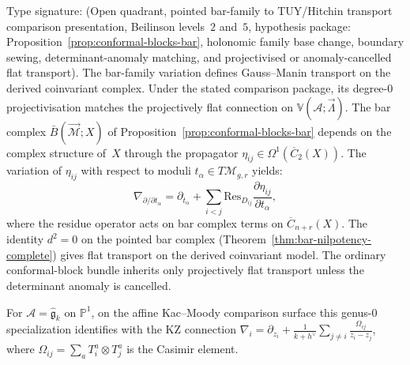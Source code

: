 \begin{proposition}
\label{prop:kzb-bar-complex}
Type signature: \textup{(}Open quadrant, pointed bar-family to
TUY/Hitchin transport comparison presentation, Beilinson levels~$2$
and~$5$, hypothesis package: Proposition~\textup{\ref{prop:conformal-blocks-bar}},
holonomic family base change, boundary sewing, determinant-anomaly
matching, and projectivised or anomaly-cancelled flat
transport\textup{)}.
The bar-family variation defines Gauss--Manin transport on the derived
coinvariant complex. Under the stated comparison package, its
degree-$0$ projectivisation matches the projectively flat connection on
$\mathbb{V}(\mathcal{A}; \vec{\Lambda})$. The bar complex
$\bar{B}(\vec{\mathcal{M}}; X)$ of
Proposition~\textup{\ref{prop:conformal-blocks-bar}} depends on the
complex structure of~$X$ through the propagator
$\eta_{ij} \in \Omega^1(\overline{C}_2(X))$. The variation
of $\eta_{ij}$ with respect to moduli $t_\alpha \in T\mathcal{M}_{g,r}$
yields:
\[
\nabla_{\partial/\partial t_\alpha}
= \partial_{t_\alpha}
+ \sum_{i<j}
\mathrm{Res}_{D_{ij}} \frac{\partial \eta_{ij}}{\partial t_\alpha},
\]
where the residue operator acts on bar complex terms on
$\overline{C}_{n+r}(X)$. The identity $d^2 = 0$ on the pointed bar
complex \textup{(}Theorem~\ref{thm:bar-nilpotency-complete}\textup{)}
gives flat transport on the derived coinvariant model. The ordinary
conformal-block bundle inherits only projectively flat transport unless
the determinant anomaly is cancelled.

For $\mathcal{A} = \widehat{\mathfrak{g}}_k$ on $\mathbb{P}^1$, on the
affine Kac--Moody comparison surface this genus-$0$
specialization identifies with the KZ connection
$\nabla_i = \partial_{z_i} + \frac{1}{k + h^\vee}
\sum_{j \neq i} \frac{\Omega_{ij}}{z_i - z_j}$, where
$\Omega_{ij} = \sum_a T^a_i \otimes T^a_j$ is the Casimir
element.
\end{proposition}

